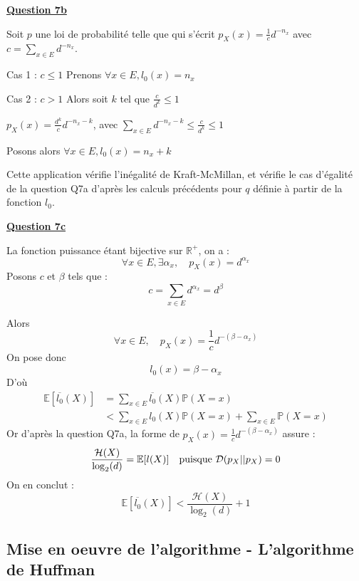 \documentclass[a4paper,twoside,10pt]{article}
\renewcommand{\H}{\mathcal{H}}
\newcommand{\D}{\mathcal{D}}
\newenvironment{Q}[1]{%
\vspace{1ex}
\underline{\textbf{Question #1\\}}
\newline
}{
\vspace{2ex}
}
\begin{document}
\begin{Q}{7b}
Soit $p$ une loi de probabilité telle que qui s'écrit $p_X(x) = \frac{1}{c}d^{-n_x}$ avec $c = \sum_{x \in E} d^{-n_x}$.

Cas 1 : $c \leq 1$ Prenons $\forall x \in E, l_0(x) = n_x$

Cas 2 : $c > 1$ Alors soit $k$ tel que $\frac{c}{d^k} \leq 1$

$p_X(x) = \frac{d^k}{c}d^{-n_x - k}$, avec $\sum_{x \in E} d^{-n_x - k} \leq \frac{c}{d^k} \leq 1$

Posons alors $\forall x \in E, l_0(x) = n_x + k$

Cette application vérifie l'inégalité de Kraft-McMillan, et vérifie le cas d'égalité de la question Q7a d'après les calculs
précédents pour $q$ définie à partir de la fonction $l_0$.
\end{Q}

\begin{Q}{7c}
La fonction puissance étant bijective sur $\mathbb{R^+}$, on a :
\[
\forall x \in E, \exists \alpha_x, \quad p_X(x) = d ^{\alpha_x}
\]
Posons $c$ et $\beta$ tels que :
\[
c = \sum_{x \in E} d ^{\alpha_x} = d^\beta
\]

Alors
\[
\forall x \in E, \quad p_X(x) = \frac{1}{c} d^{-(\beta - \alpha_x)}
\]
On pose donc
\[
l_0(x) = \beta - \alpha_x
\]
D'où
\begin{align*}
\mathbb{E}[\overline{l_0}(X)] &= \sum_{x \in E} \overline{l_0}(X) \mathbb{P}(X=x)\\
&< \sum_{x \in E} l_0(X)\mathbb{P}(X=x) + \sum_{x \in E}\mathbb{P}(X=x)
\end{align*}
Or d'après la question Q7a, la forme de $p_X(x)= \frac{1}{c} d^{-(\beta - \alpha_x)}$ assure :
\[
\frac{\H(X)}{\log_2(d)} = \mathbb{E}[l(X)] \text{\quad puisque } \D(p_X||p_X) = 0
\]
On en conclut :
\[
\mathbb{E}[\overline{l_0}(X)] < \frac{\H(X)}{\log_2(d)} + 1
\]
\end{Q}

\subsection{Mise en oeuvre de l'algorithme - L'algorithme de Huffman}
\end{document}
